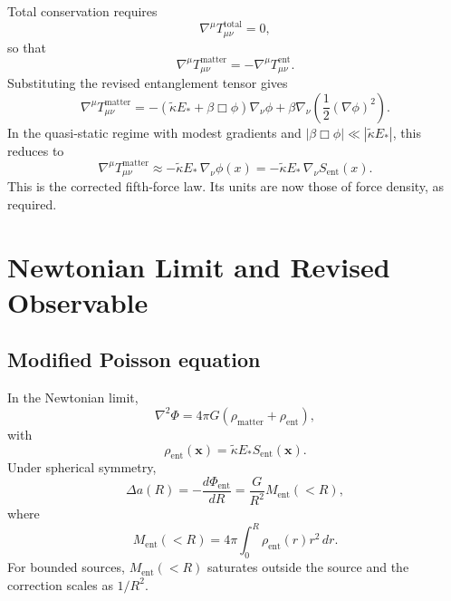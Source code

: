 \documentclass[11pt]{article}
\theoremstyle{plain}
\theoremstyle{definition}
\theoremstyle{remark}
\begin{document}
Total conservation requires
\begin{equation}
\nabla^\mu T^{\mathrm{total}}_{\mu\nu} = 0,
\end{equation}
so that
\begin{equation}
\nabla^\mu T^{\mathrm{matter}}_{\mu\nu} = -\nabla^\mu T^{\mathrm{ent}}_{\mu\nu}.
\end{equation}
Substituting the revised entanglement tensor gives
\begin{equation}
\nabla^\mu T^{\mathrm{matter}}_{\mu\nu} = -\left(\tilde{\kappa} E_* + \beta\Box\phi\right)\nabla_\nu\phi + \beta\nabla_\nu\left(\frac{1}{2}(\nabla\phi)^2\right).
\end{equation}
In the quasi-static regime with modest gradients and $|\beta\Box\phi| \ll |\tilde{\kappa}E_*|$, this reduces to
\begin{equation}
\nabla^\mu T^{\mathrm{matter}}_{\mu\nu} \approx -\tilde{\kappa}E_*\,\nabla_\nu\phi(x) = -\tilde{\kappa}E_*\,\nabla_\nu S_{\mathrm{ent}}(x).
\end{equation}
This is the corrected fifth-force law. Its units are now those of force density, as required.

\section{Newtonian Limit and Revised Observable}

\subsection{Modified Poisson equation}

In the Newtonian limit,
\begin{equation}
\nabla^2 \Phi = 4\pi G\left(\rho_{\mathrm{matter}} + \rho_{\mathrm{ent}}\right),
\end{equation}
with
\begin{equation}
\rho_{\mathrm{ent}}(\mathbf{x}) = \tilde{\kappa} E_* S_{\mathrm{ent}}(\mathbf{x}).
\end{equation}
Under spherical symmetry,
\begin{equation}
\Delta a(R) = -\frac{d\Phi_{\mathrm{ent}}}{dR} = \frac{G}{R^2}M_{\mathrm{ent}}(<R),
\end{equation}
where
\begin{equation}
M_{\mathrm{ent}}(<R) = 4\pi\int_0^R \rho_{\mathrm{ent}}(r)r^2\,dr.
\end{equation}
For bounded sources, $M_{\mathrm{ent}}(<R)$ saturates outside the source and the correction scales as $1/R^2$.
\end{document}
